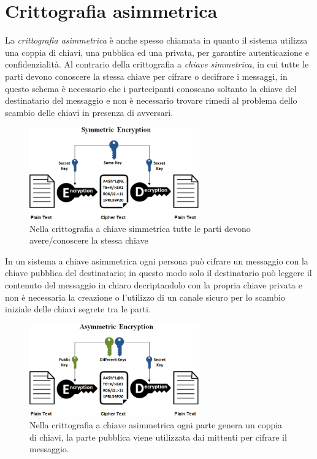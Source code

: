\section{Crittografia asimmetrica}
La \textit{crittografia asimmetrica} è anche spesso chiamata  in quanto il sistema utilizza una coppia di chiavi, una pubblica ed una privata, per garantire autenticazione e confidenzialità.
Al contrario della crittografia a \textit{chiave simmetrica}, in cui tutte le parti devono conoscere la stessa chiave per cifrare o decifrare i messaggi, in questo schema è necessario che i partecipanti conoscano soltanto la chiave  del destinatario del messaggio e non è necessario trovare rimedi al problema dello scambio delle chiavi in presenza di avversari.
\begin{figure}[H]
    \centering
    \includegraphics[width=0.65\textwidth]{images/simmetric.png}
    \caption{Nella crittografia a chiave simmetrica tutte le parti devono avere/conoscere la stessa chiave}
\end{figure}
In un sistema a chiave asimmetrica ogni persona può cifrare un messaggio con la chiave pubblica del destinatario; in questo modo solo il destinatario può leggere il contenuto del messaggio in chiaro decriptandolo con la propria chiave privata e non è necessaria la creazione o l'utilizzo di un canale sicuro per lo scambio iniziale delle chiavi segrete tra le parti.
\begin{figure}
    \centering
    \includegraphics[width=0.65\textwidth]{images/asymmetric.png}
    \caption{Nella crittografia a chiave asimmetrica ogni parte genera un coppia di chiavi, la parte pubblica viene utilizzata dai mittenti per cifrare il messaggio.}
\end{figure}
